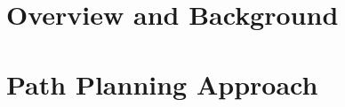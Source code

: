 \documentclass[]{report}
\begin{document}
	\ifdraft{\listoftodos{}}{}
%
	
	
%
	\clearpage
%
	\tableofcontents
	\listoffigures
	\listoftables
	\listofalgorithms{}
	
%
	\clearpage

	\part{Overview and Background}%
	\label{part:overview_and_background}

		
		
		

	\part{Path Planning Approach}%
	\label{part:path_planning_approach}


		
		
		
		
		

	\clearpage
	\appendix
		

	\appendix
	\printbibliography{}
\end{document}

